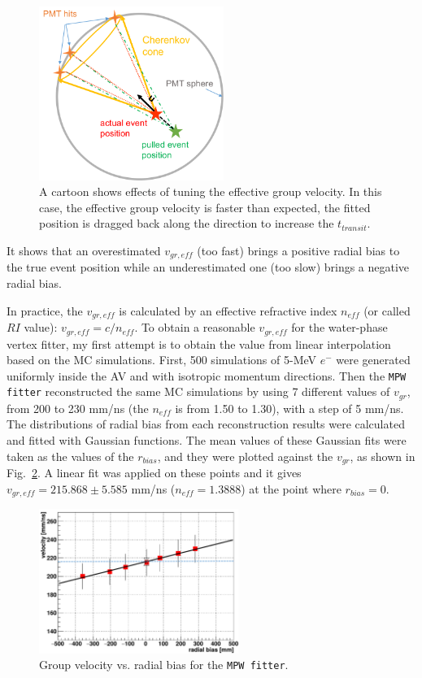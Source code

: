 \begin{figure}[!htb]
	\centering
	\includegraphics[width=6cm]{effectOfGroupVelocity.png}
	\caption{A cartoon shows effects of tuning the effective group velocity. In this case, the effective group velocity is faster than expected, the fitted position is dragged back along the direction to increase the $t_{transit}$.	\label{fig:effectiveVg}}
\end{figure}
It shows that an overestimated $v_{gr,eff}$ (too fast) brings a positive radial bias to the true event position while an underestimated one (too slow) brings a negative radial bias.

In practice, the $v_{gr,eff}$ is calculated by an effective refractive index $n_{eff}$ (or called $RI$ value): $v_{gr,eff}=c/n_{eff}$. To obtain a reasonable $v_{gr,eff}$ for the water-phase vertex fitter, my first attempt is to obtain the value from linear interpolation based on the MC simulations. First, 500 simulations of 5-MeV $e^-$ were generated uniformly inside the AV and with isotropic momentum directions. Then the \texttt{MPW fitter} reconstructed the same MC simulations by using 7 different values of $v_{gr}$, from 200 to 230 mm/ns (the $n_{eff}$ is from 1.50 to 1.30), with a step of 5 mm/ns. The distributions of radial bias from each reconstruction results were calculated and fitted with Gaussian functions. The mean values of these Gaussian fits were taken as the values of the $r_{bias}$, and they were plotted against the $v_{gr}$, as shown in Fig.~\ref{fig:plotVgr}. A linear fit was applied on these points and it gives $v_{gr,eff}=215.868\pm 5.585$ mm/ns ($n_{eff}=1.3888$) at the point where $r_{bias}=0$.

\begin{figure}[!htb]
	\centering
	\includegraphics[width=6.5cm]{tune_groupVelocity_MPW.png}
	\caption[Group velocity vs. radial bias for the \texttt{MPW fitter}.]{Group velocity vs. radial bias for the \texttt{MPW fitter}.	\label{fig:plotVgr}}
\end{figure}

